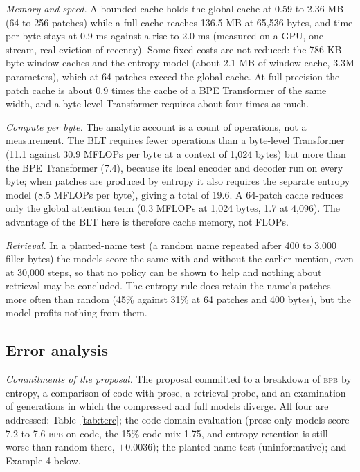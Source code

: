 \documentclass[10pt,twocolumn]{extarticle}
\newcommand{\bpb}{\textsc{bpb}}
\begin{document}
\textit{Memory and speed.} A bounded cache holds the global cache at 0.59 to 2.36 MB (64 to 256 patches) while a full cache reaches 136.5 MB at 65,536 bytes, and time per byte stays at 0.9 ms against a rise to 2.0 ms (measured on a GPU, one stream, real eviction of recency). Some fixed costs are not reduced: the 786 KB byte-window caches and the entropy model (about 2.1 MB of window cache, 3.3M parameters), which at 64 patches exceed the global cache. At full precision the patch cache is about 0.9 times the cache of a BPE Transformer of the same width, and a byte-level Transformer requires about four times as much.

\textit{Compute per byte.}\label{sec:flops} The analytic account is a count of operations, not a measurement. The BLT requires fewer operations than a byte-level Transformer (11.1 against 30.9 MFLOPs per byte at a context of 1,024 bytes) but more than the BPE Transformer (7.4), because its local encoder and decoder run on every byte; when patches are produced by entropy it also requires the separate entropy model (8.5 MFLOPs per byte), giving a total of 19.6. A 64-patch cache reduces only the global attention term (0.3 MFLOPs at 1,024 bytes, 1.7 at 4,096). The advantage of the BLT here is therefore cache memory, not FLOPs.



\textit{Retrieval.} In a planted-name test (a random name repeated after 400 to 3,000 filler bytes) the models score the same with and without the earlier mention, even at 30,000 steps, so that no policy can be shown to help and nothing about retrieval may be concluded. The entropy rule does retain the name's patches more often than random (45\% against 31\% at 64 patches and 400 bytes), but the model profits nothing from them.

\subsection{Error analysis}\label{sec:errors}
\textit{Commitments of the proposal.} The proposal committed to a breakdown of \bpb{} by entropy, a comparison of code with prose, a retrieval probe, and an examination of generations in which the compressed and full models diverge. All four are addressed: Table~\ref{tab:terc}; the code-domain evaluation (prose-only models score 7.2 to 7.6 \bpb{} on code, the 15\% code mix 1.75, and entropy retention is still worse than random there, $+0.0036$); the planted-name test (uninformative); and Example 4 below.

\end{document}

